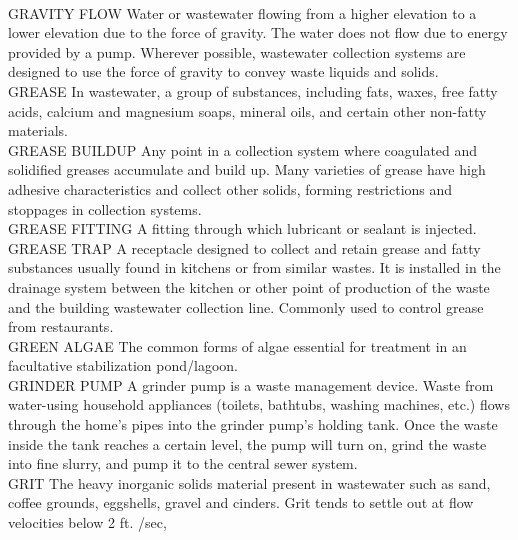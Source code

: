 \vspace{0.3cm}\\
GRAVITY FLOW
Water or wastewater flowing from a higher elevation to a lower elevation due to the force of gravity. The water does not flow due to energy provided by a pump. Wherever possible, wastewater collection systems are designed to use the force of gravity to convey waste liquids and solids. 
\vspace{0.3cm}\\
GREASE
In wastewater, a group of substances, including fats, waxes, free fatty acids, calcium and magnesium soaps, mineral oils, and certain other non-fatty materials.
\vspace{0.3cm}\\
GREASE BUILDUP
Any point in a collection system where coagulated and solidified greases accumulate and build up. Many varieties of grease have high adhesive characteristics and collect other solids, forming restrictions and stoppages in collection systems. 
\vspace{0.3cm}\\
GREASE FITTING
A fitting through which lubricant or sealant is injected.
\vspace{0.3cm}\\
GREASE TRAP
A receptacle designed to collect and retain grease and fatty substances usually found in kitchens or from similar wastes. It is installed in the drainage system between the kitchen or other point of production of the waste and the building wastewater collection line. Commonly used to control grease from restaurants. 
\vspace{0.3cm}\\
GREEN ALGAE
The common forms of algae essential for treatment in an facultative stabilization pond/lagoon.
\vspace{0.3cm}\\
GRINDER PUMP
A grinder pump is a waste management device. Waste from water-using household appliances (toilets, bathtubs, washing machines, etc.) flows through the home’s pipes into the grinder pump’s holding tank. Once the waste inside the tank reaches a certain level, the pump will turn on, grind the waste into fine slurry, and pump it to the central sewer system.
\vspace{0.3cm}\\
GRIT
The heavy inorganic solids material present in wastewater such as sand, coffee grounds, eggshells, gravel and cinders. Grit tends to settle out at flow velocities below 2 ft. /sec, 
\vspace{0.3cm}\\
